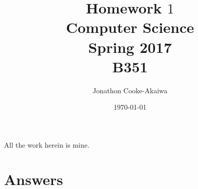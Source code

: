 \documentclass{article}
\begin{document}
\title{Homework $1$\\ Computer Science \\ Spring 2017\\ B351}         %
\author{Jonathon Cooke-Akaiwa}        %
\date{\today}          %
\maketitle


\makeatother     %




\pagestyle{plain}
All the work herein is mine.

\section*{Answers}
\end{document}

